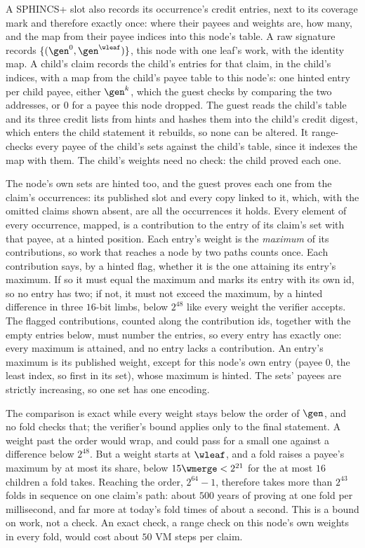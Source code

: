 A SPHINCS+ slot also records its occurrence's credit entries, next to its coverage mark and therefore exactly once: where their payees and weights are, how many, and the map from their payee indices into this node's table. A raw signature records $\{(\gen^0, \gen^{\wleaf})\}$, this node with one leaf's work, with the identity map. A child's claim records the child's entries for that claim, in the child's indices, with a map from the child's payee table to this node's: one hinted entry per child payee, either $\gen^k$, which the guest checks by comparing the two addresses, or $0$ for a payee this node dropped. The guest reads the child's table and its three credit lists from hints and hashes them into the child's credit digest, which enters the child statement it rebuilds, so none can be altered. It range-checks every payee of the child's sets against the child's table, since it indexes the map with them. The child's weights need no check: the child proved each one.

The node's own sets are hinted too, and the guest proves each one from the claim's occurrences: its published slot and every copy linked to it, which, with the omitted claims shown absent, are all the occurrences it holds. Every element of every occurrence, mapped, is a contribution to the entry of its claim's set with that payee, at a hinted position. Each entry's weight is the \emph{maximum} of its contributions, so work that reaches a node by two paths counts once. Each contribution says, by a hinted flag, whether it is the one attaining its entry's maximum. If so it must equal the maximum and marks its entry with its own id, so no entry has two; if not, it must not exceed the maximum, by a hinted difference in three $16$-bit limbs, below $2^{48}$ like every weight the verifier accepts. The flagged contributions, counted along the contribution ids, together with the empty entries below, must number the entries, so every entry has exactly one: every maximum is attained, and no entry lacks a contribution. An entry's maximum is its published weight, except for this node's own entry (payee $0$, the least index, so first in its set), whose maximum is hinted. The sets' payees are strictly increasing, so one set has one encoding.

The comparison is exact while every weight stays below the order of $\gen$, and no fold checks that; the verifier's bound applies only to the final statement. A weight past the order would wrap, and could pass for a small one against a difference below $2^{48}$. But a weight starts at $\wleaf$, and a fold raises a payee's maximum by at most its share, below $15\wmerge < 2^{21}$ for the at most $16$ children a fold takes. Reaching the order, $2^{64}-1$, therefore takes more than $2^{43}$ folds in sequence on one claim's path: about $500$ years of proving at one fold per millisecond, and far more at today's fold times of about a second. This is a bound on work, not a check. An exact check, a range check on this node's own weights in every fold, would cost about $50$ VM steps per claim.


